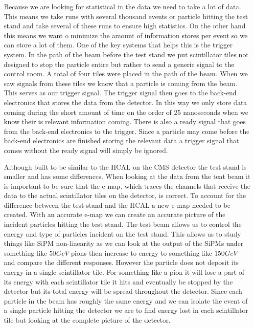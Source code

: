 Because we are looking for statistical in the data we need to take a lot of data. This means we take runs with several thousand events or particle hitting the test stand and take several of these runs to ensure high statistics. On the other hand this means we want o minimize the amount of information stores per event so we can store a lot of them. One of the key systems that helps this is the trigger system. In the path of the beam before the test stand we put scintillator tiles not designed to stop the particle entire but rather to send a generic signal to the control room. A total of four tiles were placed in the path of the beam. When we saw signals from these tiles we know that a particle is coming from the beam. This serves as our trigger signal. The trigger signal then goes to the back-end electronics that stores the data from the detector. In this way we only store data coming during the short amount of time on the order of 25 nanoseconds when we know their is relevant information coming. There is also a ready signal that goes from the back-end electronics to the trigger. Since a particle may come before the back-end electronics are finished storing the relevant data a trigger signal that comes without the ready signal will simply be ignored.

Although built to be similar to the HCAL on the CMS detector the test stand is smaller and has some differences. When looking at the data from the teat beam it is important to be sure that the e-map, which traces the channels that receive the data to the actual scintillator tiles on the detector, is correct. To account for the difference between the test stand and the HCAL a new e-map needed to be created. With an accurate e-map we can create an accurate picture of the incident particles hitting the test stand. The test beam allows us to control the energy and type of particles incident on the test stand. This allows us to study things like SiPM non-linearity as we can look at the output of the SiPMs under something like $50 GeV$ pions then increase to energy to something like $150 GeV$ and compare the different responses. However the particle does not deposit its energy in a single scintillator tile. For something like a pion it will lose a part of its energy with each scintillator tile it hits and eventually be stopped by the detector but its total energy will be spread throughout the detector. Since each particle in the beam has roughly the same energy and we can isolate the event of a single particle hitting the detector we are to find energy lost in each scintillator tile but looking at the complete picture of the detector. 

